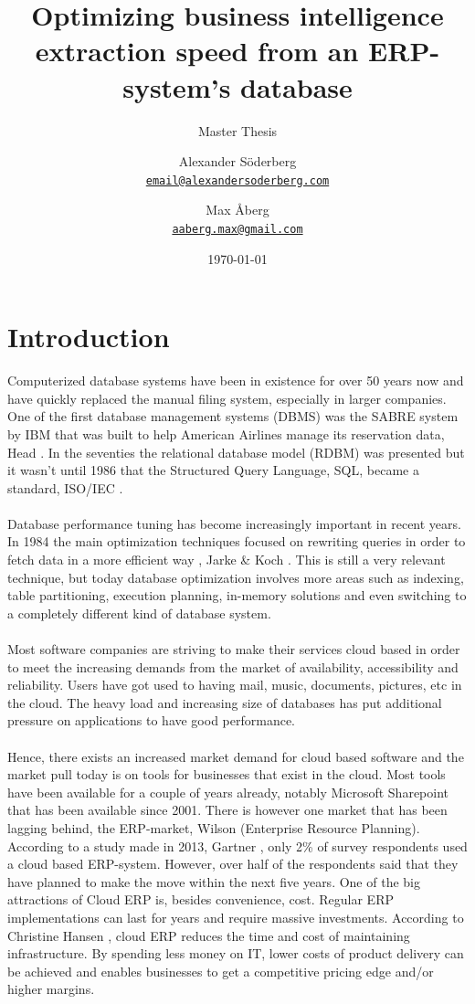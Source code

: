 \documentclass{cslthse-msc}
\author{
	Alexander Söderberg \\
	{\normalsize \href{mailto:email@alexandersoderberg.com}{\texttt{email@alexandersoderberg.com}}}
	\and
	Max Åberg \\
    {\normalsize \href{mailto:aaberg.max@gmail.com}{\texttt{aaberg.max@gmail.com}}}
}
\title{Optimizing business intelligence
extraction speed from an
ERP-system’s database}
\subtitle{Master Thesis}
\date{\today}
\begin{document}
\makefrontmatter

\chapter[Introduction]{Introduction}
Computerized database systems have been in existence for over 50 years now and have quickly replaced the manual filing system, especially in larger companies. One of the first database management systems (DBMS) was the SABRE system by IBM that was built to help American Airlines manage its reservation data, Head \cite{Head02}. In the seventies the relational database model (RDBM) was presented but it wasn't until 1986 that the Structured Query Language, SQL, became a standard, ISO/IEC \cite{sql1}. \\\\
Database performance tuning has become increasingly important in recent years. In 1984 the main optimization techniques focused on rewriting queries in order to fetch data in a more efficient way , Jarke \& Koch \cite{jarke1984query}. This is still a very relevant technique, but today database optimization involves more areas such as indexing, table partitioning, execution planning, in-memory solutions and even switching to a completely different kind of database system.\\\\
Most software companies are striving to make their services cloud based in order to meet the increasing demands from the market of availability, accessibility and reliability. Users have got used to having mail, music, documents, pictures, etc in the cloud. The heavy load and increasing size of databases has put additional pressure on applications to have good performance.\\\\
Hence, there exists an increased market demand for cloud based software and the market pull today is on tools for businesses that exist in the cloud. Most tools have been available for a couple of years already, notably Microsoft Sharepoint that has been available since 2001. There is however one market that has been lagging behind, the ERP-market, Wilson \cite{wilson} (Enterprise Resource Planning). According to a study made in 2013, Gartner \cite{Rayner13}, only 2\% of survey respondents used a cloud based ERP-system. However, over half of the respondents said that they have planned to make the move within the next five years. One of the big attractions of Cloud ERP is, besides convenience, cost. Regular ERP implementations can last for years and require massive investments. According to Christine Hansen \cite{Robb14}, cloud ERP reduces the time and cost of maintaining infrastructure. By spending less money on IT, lower costs of product delivery can be achieved and enables businesses to get a competitive pricing edge and/or higher margins.\\\\
\end{document}
